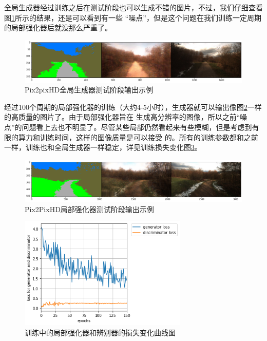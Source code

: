 \documentclass[supercite]{HustGraduPaper}
\theoremstyle{definition}
\begin{document}
全局生成器经过训练之后在测试阶段也可以生成不错的图片，不过，我们仔细查看图\ref{fig:global-generator-output}所示的结果，还是可以看到有一些
“噪点”，但是这个问题在我们训练一定周期的局部强化器后就没那么严重了。
\begin{figure}[H]
  \begin{center}
  \includegraphics[width=14cm]{images/global-generator-output}
  \end{center}
  \caption{Pix2pixHD全局生成器测试阶段输出示例}
  \label{fig:global-generator-output}
\end{figure}

经过100个周期的局部强化器的训练（大约4-5小时），生成器就可以输出像图\ref{fig:local-enhancer-output}一样的高质量的图片了。由于局部强化器旨在
生成高分辨率的图像，所以之前“噪点”的问题看上去也不明显了。尽管某些局部仍然看起来有些模糊，但是考虑到有限的算力和训练时间，这样的图像质量是可以接受
的。所有的训练参数都和之前一样，训练也和全局生成器一样稳定，详见训练损失变化图\ref{fig:local-enhancer-loss}。

\begin{figure}[H]
  \begin{center}
  \includegraphics[width=14cm]{images/local-enhancer-output}
  \end{center}
  \caption{Pix2PixHD局部强化器测试阶段输出示例}
  \label{fig:local-enhancer-output}
\end{figure}

\begin{figure}[H]
  \begin{center}
  \includegraphics[width=8cm]{images/local-enhancer-loss}
  \end{center}
  \caption{训练中的局部强化器和辨别器的损失变化曲线图}
  \label{fig:local-enhancer-loss}
\end{figure}
\end{document}
